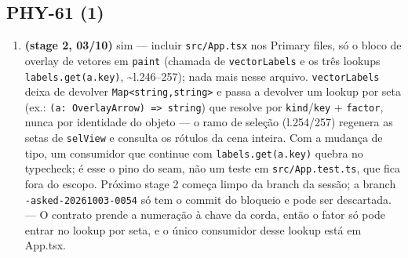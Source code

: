 \documentclass[11pt,a4paper]{article}
\begin{document}
{\subsection*{PHY-61 (1)}
\begin{enumerate}
  \item \textbf{(stage 2, 03/10)} sim --- incluir \texttt{src/App.tsx} nos Primary files, só o bloco de overlay de vetores em \texttt{paint} (chamada de \texttt{vectorLabels} e os três lookups \texttt{labels.get(a.key)}, \textasciitilde{}l.246--257); nada mais nesse arquivo. \texttt{vectorLabels} deixa de devolver \texttt{Map<string,string>} e passa a devolver um lookup por seta (ex.: \texttt{(a: OverlayArrow) => string}) que resolve por \texttt{kind}/\texttt{key} + \texttt{factor}, nunca por identidade do objeto --- o ramo de seleção (l.254/257) regenera as setas de \texttt{selView} e consulta os rótulos da cena inteira. Com a mudança de tipo, um consumidor que continue com \texttt{labels.get(a.key)} quebra no typecheck; é esse o pino do seam, não um teste em \texttt{src/App.test.ts}, que fica fora do escopo. Próximo stage 2 começa limpo da branch da sessão; a branch \texttt{-asked-20261003-0054} só tem o commit do bloqueio e pode ser descartada. --- O contrato prende a numeração à chave da corda, então o fator só pode entrar no lookup por seta, e o único consumidor desse lookup está em App.tsx.
\end{enumerate}
}
\end{document}
